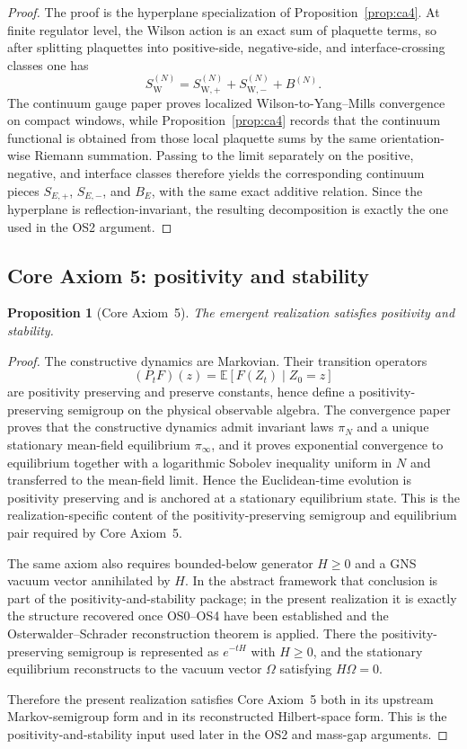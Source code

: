 \documentclass[11pt]{article}
\newtheorem{proposition}[theorem]{Proposition}
\theoremstyle{definition}
\theoremstyle{remark}
\begin{document}
\begin{proof}
The proof is the hyperplane specialization of Proposition~\ref{prop:ca4}.  At
finite regulator level, the Wilson action is an exact sum of plaquette terms,
so after splitting plaquettes into positive-side, negative-side, and
interface-crossing classes one has
\[
S_{\mathrm W}^{(N)}
=
S_{\mathrm W,+}^{(N)}+S_{\mathrm W,-}^{(N)}+B^{(N)}.
\]
The continuum gauge paper proves localized Wilson-to-Yang--Mills convergence on
compact windows, while Proposition~\ref{prop:ca4} records that the continuum
functional is obtained from those local plaquette sums by the same
orientation-wise Riemann summation.  Passing to the limit separately on the
positive, negative, and interface classes therefore yields the corresponding
continuum pieces \(S_{E,+}\), \(S_{E,-}\), and \(B_E\), with the same exact
additive relation.  Since the hyperplane is reflection-invariant, the resulting
decomposition is exactly the one used in the OS2 argument.
\end{proof}

\subsection{Core Axiom 5: positivity and stability}

\begin{proposition}[Core Axiom~5]
\label{prop:ca5}
The emergent realization satisfies positivity and stability.
\end{proposition}

\begin{proof}
The constructive dynamics are Markovian.
Their transition operators
\[
(P_tF)(z)=\mathbb E[F(Z_t)\mid Z_0=z]
\]
are positivity preserving and preserve constants, hence define a
positivity-preserving semigroup on the physical observable algebra.
The convergence paper proves that the constructive dynamics admit invariant laws
$\pi_N$ and a unique stationary mean-field equilibrium $\pi_\infty$, and it
proves exponential convergence to equilibrium together with a logarithmic
Sobolev inequality uniform in $N$ and transferred to the mean-field limit.
Hence the Euclidean-time evolution is positivity preserving and is anchored at a
stationary equilibrium state.  This is the realization-specific content of the
positivity-preserving semigroup and equilibrium pair required by Core Axiom~5.

The same axiom also requires bounded-below generator $H\ge0$ and a GNS vacuum
vector annihilated by $H$.  In the abstract framework that conclusion is part of
the positivity-and-stability package; in the present realization it is exactly
the structure recovered once OS0--OS4 have been established and the
Osterwalder--Schrader reconstruction theorem is applied.  There the
positivity-preserving semigroup is represented as $e^{-tH}$ with $H\ge0$, and
the stationary equilibrium reconstructs to the vacuum vector $\Omega$
satisfying $H\Omega=0$.

Therefore the present realization satisfies Core Axiom~5 both in its upstream
Markov-semigroup form and in its reconstructed Hilbert-space form.  This is the
positivity-and-stability input used later in the OS2 and mass-gap arguments.
\end{proof}
\end{document}
